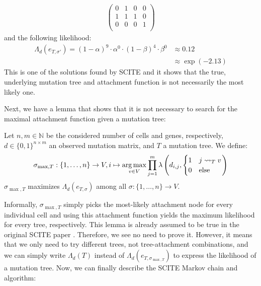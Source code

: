 \begin{example}
\begin{align*}
\begin{pmatrix}
            0 & 1 & 0 & 0 \\
            1 & 1 & 1 & 0 \\
            0 & 0 & 0 & 1 \\
        \end{pmatrix}
    \end{align*}
    and the following likelihood:
    \begin{align*}
        \Lambda_d(e_{T, \sigma'}) = (1-\alpha)^{9} \cdot \alpha^{0} \cdot (1-\beta)^{4} \cdot \beta^{0} &\approx 0.12 \\
        &\approx \exp(-2.13) 
    \end{align*}
    This is one of the solutions found by \ac{SCITE} and it shows that the true, underlying mutation tree and attachment function is not necessarily the most likely one.
\end{example}

Next, we have a lemma that shows that it is not necessary to search for the maximal attachment function given a mutation tree:

\begin{lemma}
    \label{lem:max_attachment}
    Let $n, m \in \mathbb{N}$ be the considered number of cells and genes, respectively, $d \in \{0,1\}^{n \times m}$ an observed mutation matrix, and $T$ a mutation tree. We define:
    \begin{align*}
        \sigma_{\max, T}: \{1, \dots, n\} \rightarrow V, i \mapsto \operatorname*{arg\,max}_{v \in V} \prod_{j = 1}^m \lambda \left(d_{i,j}, \begin{cases}
            1 & j \leadsto_T v \\
            0 & \mathrm{else} \\
        \end{cases}\right)
    \end{align*}
    $\sigma_{\max, T}$ maximizes $\Lambda_d (e_{T, \sigma})$ among all $\sigma: \{1, \dots, n\} \rightarrow V$.
\end{lemma}

Informally, $\sigma_{\max, T}$ simply picks the most-likely attachment node for every individual cell and using this attachment function yields the maximum likelihood for every tree, respectively. This lemma is already assumed to be true in the original SCITE paper \cite{tree2016}. Therefore, we see no need to prove it. However, it means that we only need to try different trees, not tree-attachment combinations, and we can simply write $\Lambda_d(T)$ instead of $\Lambda_d(e_{T, \sigma_{\max, T}})$ to express the likelihood of a mutation tree. Now, we can finally describe the \ac{SCITE} Markov chain and algorithm:


